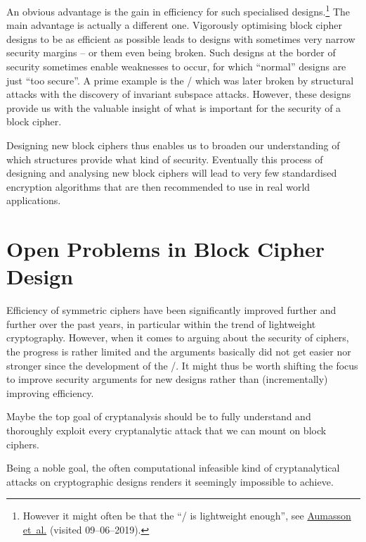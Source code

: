 An obvious advantage is the gain in efficiency for such specialised designs.\footnote{%
    However it might often be that the \enquote{\AES/ is lightweight enough}, see \href{https://blog.teserakt.io/2019/06/03/cryptography-in-industrial-embedded-systems-our-experience-of-the-needs-and-constraints/}{Aumasson et~al.} (visited 09--06--2019).
}
The main advantage is actually a different one.
Vigorously optimising block cipher designs to be as efficient as possible leads to designs with sometimes very narrow security margins -- or them even being broken.
Such designs at the border of security sometimes enable weaknesses to occur, for which \enquote{normal} designs are just \enquote{too secure}.
A prime example is the \printcipher/ which was later broken by structural attacks with the discovery of invariant subspace attacks.
However, these designs provide us with the valuable insight of what is important for the security of a block cipher.

Designing new block ciphers thus enables us to broaden our understanding of which structures provide what kind of security.
Eventually this process of designing and analysing new block ciphers will lead to very few standardised encryption algorithms that are then recommended to use in real world applications.

\section{Open Problems in Block Cipher Design}

Efficiency of symmetric ciphers have been significantly improved further and further over the past years, in particular within the trend of lightweight cryptography.
However, when it comes to arguing about the security of ciphers, the progress is rather limited and the arguments basically did not get easier nor stronger since the development of the \AES/.
It might thus be worth shifting the focus to improve security arguments for new designs rather than (incrementally) improving efficiency.

Maybe the top goal of cryptanalysis should be to fully understand and thoroughly exploit every cryptanalytic attack that we can mount on block ciphers.

Being a noble goal, the often computational infeasible kind of cryptanalytical attacks on cryptographic designs renders it seemingly impossible to achieve.

